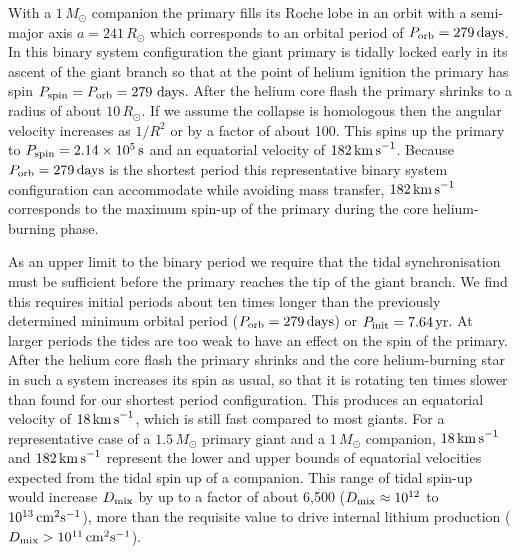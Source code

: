 \documentclass[twocolumn]{aastex62}
\begin{document}
With a $1\,M_\odot$ companion the primary fills its Roche lobe in an orbit with a 
semi-major axis $a = 241\,R_\odot$ which corresponds to an orbital period of 
$P_{\rm orb} = 279\,{\rm days}$. In this binary system configuration the giant
primary is tidally locked early in its ascent of the giant branch so that at the point
of helium ignition the primary has spin
$P_{\rm spin} = P_{\rm orb} = 279~{\rm days}$. After the helium core flash the
primary shrinks to a radius of about $10\,R_\odot$. If we assume the collapse
is homologous then the angular velocity increases as $1/R^2$ or by a factor
of about 100. This spins up the primary to 
$P_{\rm spin} = 2.14\times10^5\,{\rm s}$ and an equatorial velocity of $182\,\rm{km\,s}^{-1}$.
Because $P_{\rm orb} = 279\,{\rm days}$ is the shortest period this representative binary system configuration
can accommodate while avoiding mass transfer, $182\,\rm{km\,s}^{-1}$ corresponds 
to the maximum spin-up of the primary during the core helium-burning phase.

As an upper limit to the binary period we require that the tidal synchronisation must be sufficient
before the primary reaches the tip of the giant branch. We find this requires initial
periods about ten times longer than the previously determined minimum orbital period ($P_{\rm orb} = 279\,{\rm days}$) or $P_{\rm init} = 7.64\,{\rm yr}$. 
At larger periods the tides are too weak to have an effect on the spin of the
primary.
After the helium core flash the primary shrinks and the core helium-burning star
in such a system increases its spin as usual, so that it is rotating  ten times slower than found for our shortest period configuration. This produces an equatorial
velocity of $18\,{\rm km\,s}^{-1}$, which is still fast compared to most giants. For a representative case of a $1.5\,M_\odot$ primary giant and a $1\,M_\odot$
companion, $18\,{\rm km\,s}^{-1}$ and $182\,\rm{km\,s}^{-1}$ represent the
lower and upper bounds of equatorial velocities expected from the tidal spin up of
a companion. This range of tidal spin-up would increase $D_{\rm mix}$ by up to a factor of about 6,500 ($D_{\rm mix} \approx 10^{12}$ to $10^{13}\,{\rm cm}^{2}{\rm s}^{-1}$), more than the requisite value to drive internal lithium production ($D_{\rm mix} > 10^{11}\,{\rm cm}^{2}{\rm s}^{-1}$).
\end{document}
